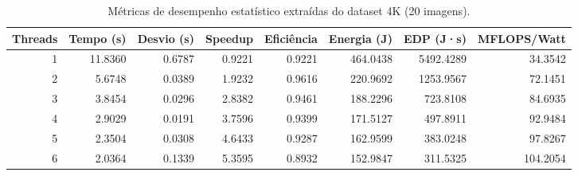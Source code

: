 \begin{table}
\caption{Métricas de desempenho estatístico extraídas do dataset 4K (20 imagens).}
\label{tab:resultados_4k}
\begin{tabular}{rrrrrrrr}
\toprule
Threads & Tempo (s) & Desvio (s) & Speedup & Eficiência & Energia (J) & EDP (J·s) & MFLOPS/Watt \\
\midrule
1 & 11.8360 & 0.6787 & 0.9221 & 0.9221 & 464.0438 & 5492.4289 & 34.3542 \\
2 & 5.6748 & 0.0389 & 1.9232 & 0.9616 & 220.9692 & 1253.9567 & 72.1451 \\
3 & 3.8454 & 0.0296 & 2.8382 & 0.9461 & 188.2296 & 723.8108 & 84.6935 \\
4 & 2.9029 & 0.0191 & 3.7596 & 0.9399 & 171.5127 & 497.8911 & 92.9484 \\
5 & 2.3504 & 0.0308 & 4.6433 & 0.9287 & 162.9599 & 383.0248 & 97.8267 \\
6 & 2.0364 & 0.1339 & 5.3595 & 0.8932 & 152.9847 & 311.5325 & 104.2054 \\
\bottomrule
\end{tabular}
\end{table}
